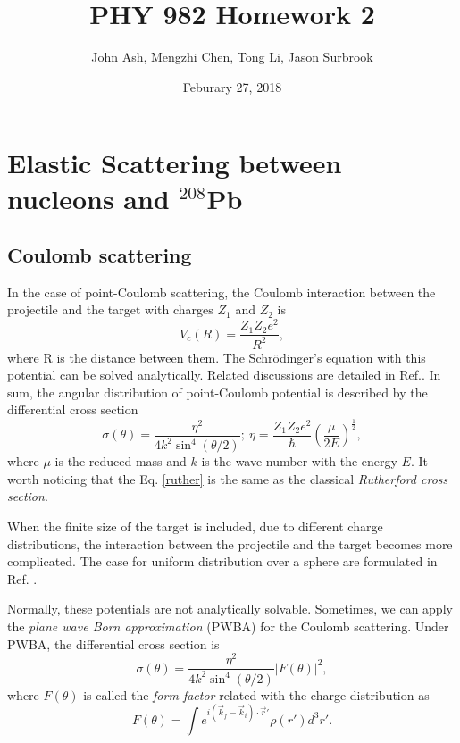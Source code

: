 \documentclass[12pt]{article}
\title{PHY 982 Homework 2}
\author{John Ash, Mengzhi Chen, Tong Li, Jason Surbrook}
\date{Feburary 27, 2018}
\begin{document}
\maketitle

\section{Elastic Scattering between nucleons and $^{208}$Pb}
\subsection{Coulomb scattering}
	In the case of point-Coulomb scattering, the Coulomb interaction between the projectile and the target with charges $Z_1$ and $Z_2$ is 
	\begin{equation}
		V_c(R)=\frac{Z_1Z_2e^2}{R^2},
	\end{equation}
	where R is the distance between them. The Schr\"{o}dinger's equation with this potential can be solved analytically. Related discussions are detailed in Ref.\cite{thompson2009nuclear}. In sum, the angular distribution of point-Coulomb potential is described by the differential cross section
	\begin{equation}\label{ruther}
		\sigma(\theta)=\frac{\eta^2}{4k^2\sin^4(\theta/2)};\ \eta=\frac{Z_1Z_2e^2}{\hbar}\left(\frac{\mu}{2E}\right)^{\frac{1}{2}},
	\end{equation} 
	where $\mu$ is the reduced mass and $k$ is the wave number with the energy $E$. It worth noticing that the Eq. \ref{ruther} is the same as the classical \emph{Rutherford cross section}.
	
	When the finite size of the target is included, due to different charge distributions, the interaction between the projectile and the target becomes more complicated. The case for uniform distribution over a sphere are formulated in Ref.  \cite{thompson2009nuclear}.
	
  		Normally, these potentials are not analytically solvable. Sometimes, we can apply the \emph{plane wave Born approximation} (PWBA) for the Coulomb scattering. Under PWBA, the differential cross section is 
  	\begin{equation}\label{ruther}
	\sigma(\theta)=\frac{\eta^2}{4k^2\sin^4(\theta/2)}\left|F(\theta)\right|^2,\end{equation}
	where $F(\theta)$ is called the \emph{form factor} related with the charge distribution as
	\begin{equation}
	F(\theta) = \int e^{i(\vec{k}_f-\vec{k}_i)\cdot\vec{r}'}\rho(r')d^3r'.
	\end{equation}
	
\end{document}
